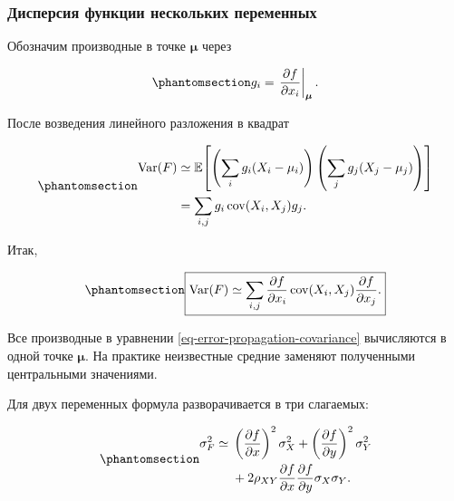 \documentclass[
  russian,
  11pt,
  a4paper,
  open=any]{scrbook}
\begin{document}
\begin{bookderivation}

\subsubsection{Дисперсия функции нескольких
переменных}\label{ux434ux438ux441ux43fux435ux440ux441ux438ux44f-ux444ux443ux43dux43aux446ux438ux438-ux43dux435ux441ux43aux43eux43bux44cux43aux438ux445-ux43fux435ux440ux435ux43cux435ux43dux43dux44bux445}

Обозначим производные в точке \(\boldsymbol\mu\) через

\begin{equation}\protect\phantomsection\label{eq-ch6-gradient-components}{
g_i=
\left.
\frac{\partial f}{\partial x_i}
\right|_{\boldsymbol\mu}.
}\end{equation}

После возведения линейного разложения в квадрат

\begin{equation}\protect\phantomsection\label{eq-ch6-multivariable-variance-derivation}{
\begin{aligned}
\operatorname{Var}(F)
&\simeq
\mathbb E\!\left[
\left(\sum_i g_i(X_i-\mu_i)\right)
\left(\sum_j g_j(X_j-\mu_j)\right)
\right]\\
&=\sum_{i,j}g_i
\operatorname{cov}(X_i,X_j)g_j.
\end{aligned}
}\end{equation}

Итак,

\begin{equation}\protect\phantomsection\label{eq-error-propagation-covariance}{
\boxed{
\operatorname{Var}(F)
\simeq
\sum_{i,j}
\frac{\partial f}{\partial x_i}
\operatorname{cov}(X_i,X_j)
\frac{\partial f}{\partial x_j}.
}
}\end{equation}

\end{bookderivation}

Все производные в уравнении \ref{eq-error-propagation-covariance}
вычисляются в одной точке \(\boldsymbol\mu\). На практике неизвестные
средние заменяют полученными центральными значениями.

Для двух переменных формула разворачивается в три слагаемых:

\begin{equation}\protect\phantomsection\label{eq-ch6-two-variable-error-propagation}{
\begin{aligned}
\sigma_F^2\simeq{}
&\left(\frac{\partial f}{\partial x}\right)^2\sigma_X^2
+\left(\frac{\partial f}{\partial y}\right)^2\sigma_Y^2\\
&+2\rho_{XY}
\frac{\partial f}{\partial x}
\frac{\partial f}{\partial y}
\sigma_X\sigma_Y.
\end{aligned}
}\end{equation}
\end{document}
